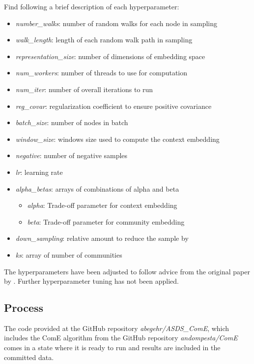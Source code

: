\documentclass[sigconf]{acmart}
\begin{document}
Find following a brief description of each hyperparameter:\cite{Cav17}
\begin{itemize}
	\item \textit{number\_walks}: number of random walks for each node in sampling
	\item \textit{walk\_length}: length of each random walk path in sampling
	\item \textit{representation\_size}: number of dimensions of embedding space
	\item \textit{num\_workers}: number of threads to use for computation
	\item \textit{num\_iter}: number of overall iterations to run
	\item \textit{reg\_covar}: regularization coefficient to ensure positive covariance
	\item \textit{batch\_size}: number of nodes in batch
	\item \textit{window\_size}: windows size used to compute the context embedding
	\item \textit{negative}: number of negative samples
	\item \textit{lr}: learning rate
	\item \textit{alpha\_betas}: arrays of combinations of alpha and beta
	\begin{itemize}
    	\item \textit{alpha}: Trade-off parameter for context embedding
    	\item \textit{beta}: Trade-off parameter for community embedding
    \end{itemize}
	\item \textit{down\_sampling}: relative amount to reduce the sample by
	\item \textit{ks}: array of number of communities
\end{itemize}

The hyperparameters have been adjusted to follow advice from the original paper by \citet{Cav17}. Further hyperparameter tuning has not been applied.

\subsection{Process}

The code provided at the GitHub repository \textit{abegehr/ASDS\_ComE}\cite{asds}, which includes the ComE algorithm from the GitHub repository \textit{andompesta/ComE}\cite{ComE} comes in a state where it is ready to run and results are included in the committed data.
\end{document}

